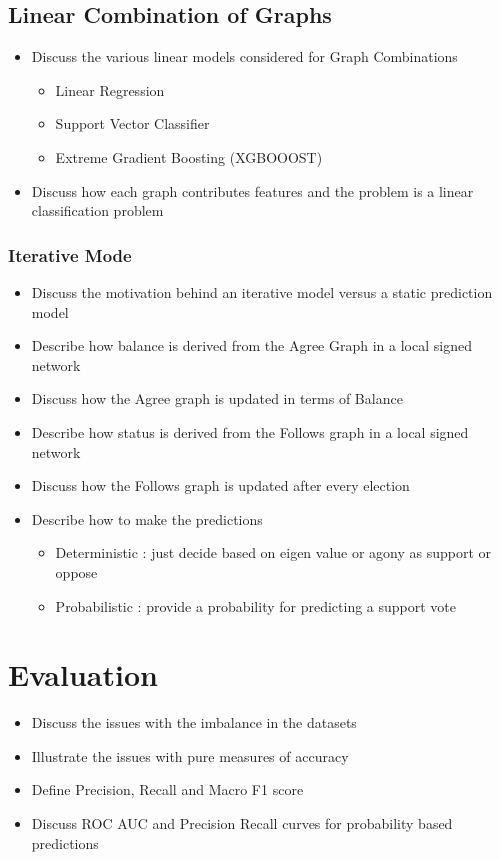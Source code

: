 \subsection{Linear Combination of Graphs}
\begin{itemize}
    \item Discuss the various linear models considered for Graph Combinations
    \begin{itemize}
        \item Linear Regression
        \item Support Vector Classifier
        \item Extreme Gradient Boosting (XGBOOOST) 
    \end{itemize}
    \item Discuss how each graph contributes features and the problem is a linear classification problem
\end{itemize}
\subsubsection{Iterative Mode}
\begin{itemize}
    \item Discuss the motivation behind an iterative model versus a static prediction model
    \item Describe how balance is derived from the Agree Graph in a local signed network
    \item Discuss how the Agree graph is updated in terms of Balance
    \item Describe how status is derived from the Follows graph in a local signed network 
    \item Discuss how the Follows graph is updated after every election
    \item Describe how to make the predictions 
    \begin{itemize}
        \item Deterministic : just decide based on eigen value or agony as support or oppose
        \item Probabilistic : provide a probability for predicting a support vote
    \end{itemize}
\end{itemize}
\section{Evaluation}
\begin{itemize}
    \item Discuss the issues with the imbalance in the datasets
    \item Illustrate the issues with pure measures of accuracy
    \item Define Precision, Recall and Macro F1 score
    \item Discuss ROC AUC and Precision Recall curves for probability based predictions 
\end{itemize}

